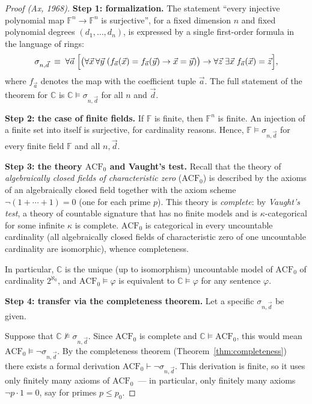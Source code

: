 \documentclass[12pt, a4paper]{article}
\theoremstyle{plain}
\theoremstyle{definition}
\renewcommand{\models}{\vDash}
\begin{document}
\begin{proof}[Proof (Ax, 1968)]

\textbf{Step 1: formalization.}
The statement ``every injective polynomial map $\mathbb{F}^n \to \mathbb{F}^n$
is surjective'', for a fixed dimension $n$ and fixed polynomial degrees
$(d_1,\ldots,d_n)$, is expressed by a single first-order formula in the language of rings:
\[
  \sigma_{n,\vec d} \;\equiv\;
  \forall \vec a\; \Bigl[
    \bigl(\forall \vec x\,\forall \vec y\;
      (f_{\vec a}(\vec x)=f_{\vec a}(\vec y) \to \vec x = \vec y)\bigr)
    \to
    \forall \vec z\;\exists \vec x\;f_{\vec a}(\vec x) = \vec z
  \Bigr],
\]
where $f_{\vec a}$ denotes the map with the coefficient tuple $\vec a$.
The full statement of the theorem for $\mathbb{C}$ is $\mathbb{C} \models \sigma_{n,\vec d}$
for all $n$ and $\vec d$.

\textbf{Step 2: the case of finite fields.}
If $\mathbb{F}$ is finite, then $\mathbb{F}^n$ is finite. An injection of a finite
set into itself is surjective, for cardinality reasons. Hence,
$\mathbb{F} \models \sigma_{n,\vec d}$ for every finite field $\mathbb{F}$
and all $n,\vec d$.

\textbf{Step 3: the theory $\mathrm{ACF}_0$ and Vaught's test.}
Recall that the theory of \emph{algebraically closed fields of characteristic zero}
($\mathrm{ACF}_0$) is described by the axioms of an algebraically closed field together with the
axiom scheme $\neg(1+\cdots+1)=0$ (one for each prime $p$). This theory
is \emph{complete}: by \emph{Vaught's test}, a theory of countable signature that has
no finite models and is $\kappa$-categorical for some infinite $\kappa$ is complete.
$\mathrm{ACF}_0$ is categorical in every uncountable cardinality (all algebraically closed
fields of characteristic zero of one uncountable cardinality are isomorphic), whence completeness.

In particular, $\mathbb{C}$ is the unique (up to isomorphism) uncountable
model of $\mathrm{ACF}_0$ of cardinality $2^{\aleph_0}$, and $\mathrm{ACF}_0 \models \varphi$
is equivalent to $\mathbb{C} \models \varphi$ for any sentence $\varphi$.

\textbf{Step 4: transfer via the completeness theorem.}
Let a specific $\sigma_{n,\vec d}$ be given.

Suppose that $\mathbb{C} \not\models \sigma_{n,\vec d}$.
Since $\mathrm{ACF}_0$ is complete and $\mathbb{C} \models \mathrm{ACF}_0$, this
would mean $\mathrm{ACF}_0 \models \neg\sigma_{n,\vec d}$. By the completeness theorem
(Theorem~\ref{thm:completeness}) there exists a formal derivation
$\mathrm{ACF}_0 \vdash \neg\sigma_{n,\vec d}$. This derivation is finite, so it
uses only finitely many axioms of $\mathrm{ACF}_0$~--- in particular,
only finitely many axioms $\neg p\cdot 1 = 0$, say for primes
$p \le p_0$.


\end{proof}
\end{document}
